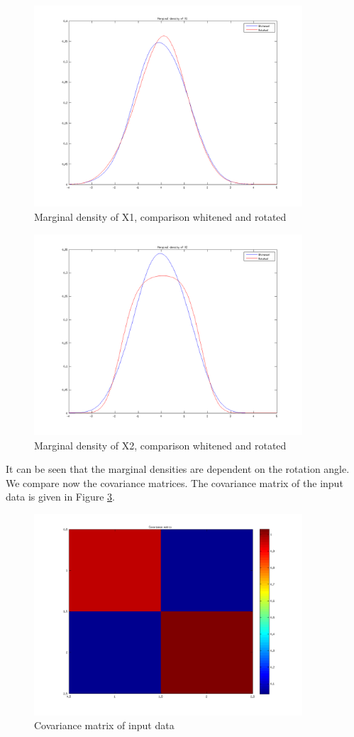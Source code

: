 \documentclass{article}
\begin{document}
		\begin{figure}[H]
			\centering
			\includegraphics[width=10cm]{task3MarginalDensityX1WhitenedRotated.png}
			\caption{Marginal density of X1, comparison whitened and rotated}
			\label{fig:task3MDWRX1}
		\end{figure}
		
		\begin{figure}[H]
			\centering
			\includegraphics[width=10cm]{task3MarginalDensityX2WhitenedRotated.png}
			\caption{Marginal density of X2, comparison whitened and rotated}
			\label{fig:task3MDWRX2}
		\end{figure}
		
		It can be seen that the marginal densities are dependent on the rotation angle.
		We compare now the covariance matrices. The covariance matrix of the input data is given in Figure \ref{fig:task3Covariance}.
		
		\begin{figure}[H]
			\centering
			\includegraphics[width=10cm]{task3Covariance.png}
			\caption{Covariance matrix of input data}
			\label{fig:task3Covariance}
		\end{figure}
		
\end{document}
